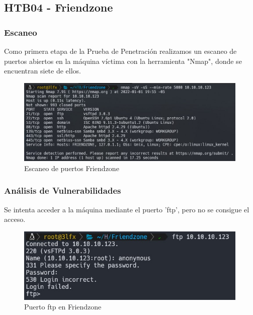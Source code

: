 \subsection{HTB04 - Friendzone}

    \subsubsection{Escaneo}
        \large{Como primera etapa de la Prueba de Penetración realizamos un escaneo de puertos abiertos en la máquina víctima con la herramienta "Nmap", donde se encuentran siete de ellos.}
        \par
        \begin{figure}[H]
            \centering
            \includegraphics[width=0.99\textwidth]{informe4/imagenes/friendzone/01_escaneo.png}
            \caption{Escaneo de puertos Friendzone} 
        \end{figure}  

    \subsubsection{Análisis de Vulnerabilidades}
        \large{Se intenta acceder a la máquina mediante el puerto 'ftp', pero no se consigue el acceso.}
        \par
        \begin{figure}[H]
            \centering
            \includegraphics[width=0.99\textwidth]{informe4/imagenes/friendzone/02_ftp.png}
            \caption{Puerto ftp en Friendzone} 
        \end{figure}
        
